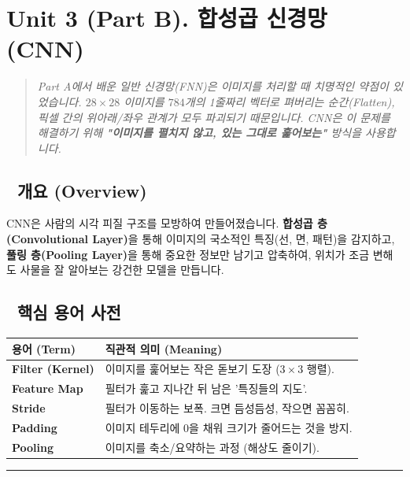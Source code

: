 \documentclass[11pt,a4paper]{book}
\theoremstyle{definition}
\begin{document}
\section{Unit 3 (Part B). 합성곱 신경망 (CNN)}

\begin{quote}
\textit{Part A에서 배운 일반 신경망(FNN)은 이미지를 처리할 때 치명적인 약점이 있었습니다. $28 \times 28$ 이미지를 $784$개의 1줄짜리 벡터로 펴버리는 순간(Flatten), 픽셀 간의 위아래/좌우 관계가 모두 파괴되기 때문입니다. CNN은 이 문제를 해결하기 위해 \textbf{"이미지를 펼치지 않고, 있는 그대로 훑어보는"} 방식을 사용합니다.}
\end{quote}

\subsection*{📌 개요 (Overview)}
CNN은 사람의 시각 피질 구조를 모방하여 만들어졌습니다. \textbf{합성곱 층(Convolutional Layer)}을 통해 이미지의 국소적인 특징(선, 면, 패턴)을 감지하고, \textbf{풀링 층(Pooling Layer)}을 통해 중요한 정보만 남기고 압축하여, 위치가 조금 변해도 사물을 잘 알아보는 강건한 모델을 만듭니다.

\subsection*{📝 핵심 용어 사전}
\begin{table}[h]
\centering
\begin{tabularx}{\textwidth}{|p{}|X|}
\hline
\textbf{용어 (Term)} & \textbf{직관적 의미 (Meaning)} \\
\hline
\textbf{Filter (Kernel)} & 이미지를 훑어보는 작은 돋보기 도장 ($3 \times 3$ 행렬). \\
\hline
\textbf{Feature Map} & 필터가 훑고 지나간 뒤 남은 '특징들의 지도'. \\
\hline
\textbf{Stride} & 필터가 이동하는 보폭. 크면 듬성듬성, 작으면 꼼꼼히. \\
\hline
\textbf{Padding} & 이미지 테두리에 0을 채워 크기가 줄어드는 것을 방지. \\
\hline
\textbf{Pooling} & 이미지를 축소/요약하는 과정 (해상도 줄이기). \\
\hline
\end{tabularx}
\end{table}

\vspace{0.5cm}\hrule\vspace{0.5cm}
\end{document}
